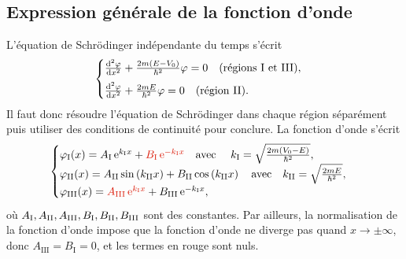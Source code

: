 \documentclass[12pt,fancy]{cours}
\begin{document}
\subsection{Expression générale de la fonction d'onde}
\noindent L'équation de Schrödinger indépendante du temps s'écrit
\begin{equation}
\begin{cases}
\frac{\mathrm{d}^2\varphi}{\mathrm{d} x^2}+\frac{2m\left(E-V_0\right)}{\hbar^2}\varphi=0\quad\text{(régions I et III)},\\[2mm]
\frac{\mathrm{d}^2\varphi}{\mathrm{d} x^2}+\frac{2mE}{\hbar^2}\varphi=0\quad\text{(région II)}.
\end{cases}
\label{eqn:schro_puits_fini}
\end{equation}
Il faut donc résoudre l'équation de Schrödinger dans chaque région séparément puis utiliser des conditions de continuité pour conclure.
La fonction d'onde s'écrit
\begin{equation}
\begin{cases}
\varphi_{\rm{I}}(x)=A_\mathrm{I}\,\e^{k_\mathrm{I}x} + \JRouge{B_\mathrm{I}\,\e^{-k_\mathrm{I}x}}\quad\text{avec }\quad k_\mathrm{I}=\sqrt{\frac{2m\left(V_0-E\right)}{\hbar^2}},\\
\varphi_{\rm{II}}(x)=A_\mathrm{II}\sin\left(k_\mathrm{II}x\right) + B_\mathrm{II}\cos\left(k_\mathrm{II}x\right)\quad\text{avec}\quad k_\mathrm{II}=\sqrt{\frac{2mE}{\hbar^2}},\\
\varphi_{\rm{III}}(x)=\JRouge{A_\mathrm{III}\,\e^{k_\mathrm{I}x}} + B_\mathrm{III}\,\e^{-k_\mathrm{I}x},
\end{cases}
\label{eq:def_k1_k2}
\end{equation}
où $A_{\rm{I}},A_{\rm{II}},A_{\rm{III}},B_{\rm{I}},B_{\rm{II}},B_{\rm{III}}$ sont des constantes. Par ailleurs, la normalisation de la fonction d'onde impose que la fonction d'onde ne diverge pas quand $x\to \pm \infty$, donc $A_\mathrm{III}=B_\mathrm{I}=0$, et les termes en rouge sont nuls.
\end{document}
